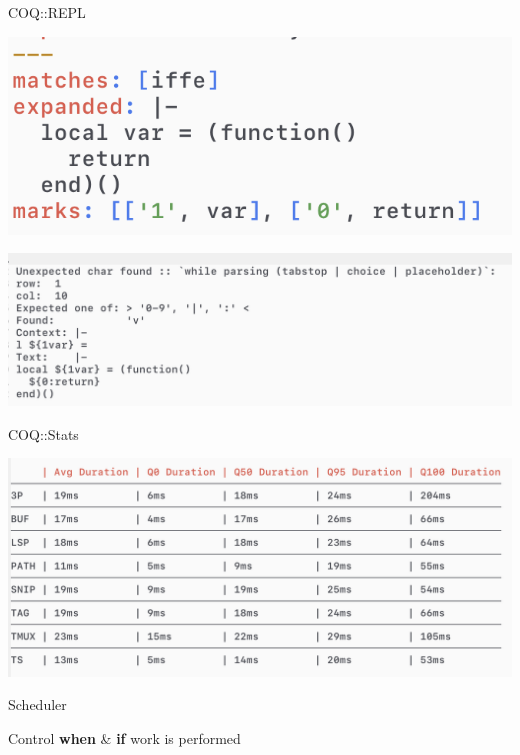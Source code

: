 \documentclass{beamer}
\begin{document}
\begin{frame}{COQ::REPL}

	\includegraphics[width=\textwidth]{repl_succ}

	\includegraphics[width=\textwidth]{repl_fail}

\end{frame}


\begin{frame}{COQ::Stats}

	\includegraphics[width=\textwidth]{stats}

\end{frame}


\begin{frame}{Scheduler}

	\begin{center}

		Control \textbf{when} \& \textbf{if} work is performed

	\end{center}

\end{frame}
\end{document}
